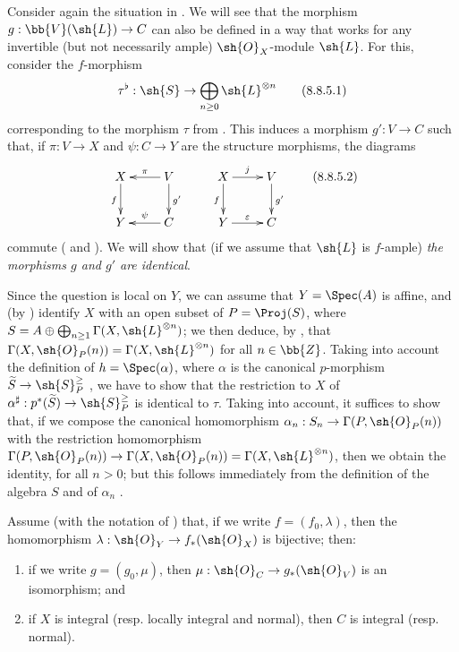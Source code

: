 \begin{env}[8.8.5]
\label{II.8.8.5}
Consider again the situation in .
We will see that the morphism $g:\bb{V}(\sh{L})\to C$ can also be defined in a way that works for any invertible (but not necessarily ample) $\sh{O}_X$-module $\sh{L}$.
For this, consider the $f$-morphism
\[
\label{II.8.8.5.1}
  \tau^\flat:\sh{S}\to\bigoplus_{n\geq0}\sh{L}^{\otimes n}
  \tag{8.8.5.1}
\]
corresponding to the morphism $\tau$ from .
This induces  a morphism $g':V\to C$ such that, if $\pi:V\to X$ and $\psi:C\to Y$ are the structure morphisms, the diagrams
\[
\label{II.8.8.5.2}
  \xymatrix{
    X
      \ar[d]_{f}
  & V
      \ar[l]_{\pi}
      \ar[d]^{g'}
  \\Y
  & C
      \ar[l]_{\psi}
  }
  \qquad
  \xymatrix{
    X
      \ar[r]^{j}
      \ar[d]_{f}
  & V
      \ar[d]^{g'}
  \\Y
      \ar[r]^{\varepsilon}
  & C
  }
\tag{8.8.5.2}
\]
commute ( and ).
We will show that (if we assume that $\sh{L}$ is $f$-ample) \emph{the morphisms $g$ and $g'$ are identical}.

Since the question is local on $Y$, we can assume that $Y=\Spec(A)$ is affine, and (by ) identify $X$ with an open subset of $P=\Proj(S)$, where $S=A\oplus\bigoplus_{n\geq1}\Gamma(X,\sh{L}^{\otimes n})$;
we then deduce, by , that $\Gamma(X,\sh{O}_P(n))=\Gamma(X,\sh{L}^{\otimes n})$ for all $n\in\bb{Z}$.
Taking into account the definition of $h=\Spec(\alpha)$, where $\alpha$ is the canonical $p$-morphism $\widetilde{S}\to\sh{S}_P^\geq$ , we have to show that the restriction to $X$ of $\alpha^\sharp:p^*(\widetilde{S})\to\sh{S}_P^\geq$ is identical to $\tau$.
Taking  into account, it suffices to show that, if we compose the canonical homomorphism $\alpha_n:S_n\to\Gamma(P,\sh{O}_P(n))$ with the restriction homomorphism $\Gamma(P,\sh{O}_P(n))\to\Gamma(X,\sh{O}_P(n))=\Gamma(X,\sh{L}^{\otimes n})$, then we obtain the identity, for all $n>0$;
but this follows immediately from the definition of the algebra $S$ and of $\alpha_n$ .
\end{env}

\begin{proposition}[8.8.6]
\label{II.8.8.6}
Assume (with the notation of ) that, if we write $f=(f_0,\lambda)$, then the homomorphism $\lambda:\sh{O}_Y\to f_*(\sh{O}_X)$ is bijective;
then:
\begin{enumerate}
  \item[\rm{(i)}] if we write $g=(g_0,\mu)$, then $\mu:\sh{O}_C\to g_*(\sh{O}_V)$ is an isomorphism; and
  \item[\rm{(ii)}] if $X$ is integral (resp. locally integral and normal), then $C$ is integral (resp. normal).
\end{enumerate}
\end{proposition}

